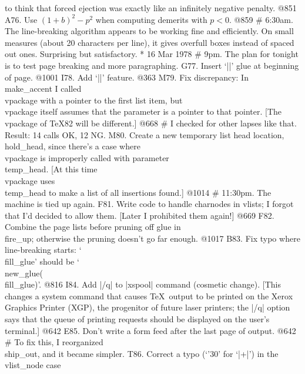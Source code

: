 {	to think that forced ejection was exactly like an
	infinitely negative penalty. @851
A76. Use $(1+b)^2-p^2$ when computing demerits with $p<0$. @859
# 6:30am. The line-breaking algorithm appears to be working fine
	and efficiently.
	On small measures (about 20 characters per line), it gives overfull boxes
	instead of spaced out ones. Surprising but satisfactory.
* 16 Mar 1978
# 9pm. The plan for tonight is to test page breaking and more paragraphing.
G77. Insert `|\topskip|' glue at beginning of page. @1001
I78. Add `|\pausing|' feature. @363
M79. Fix discrepancy: In \\{make_accent} I called \\{vpackage}
	with a pointer to the first list item, but \\{vpackage} itself assumes
	that the parameter is a pointer to that pointer. [The
	\\{vpackage} of \TeX82 will be different.] @668
# I checked for other lapses like that. Result: 14 calls OK, 12 NG.
M80. Create a new temporary list head location, \\{hold_head}, since there's
	a case where \\{vpackage} is improperly called with
	parameter \\{temp_head}. [At this time \\{vpackage} uses \\{temp_head}
	to make a list of all insertions found.] @1014
# 11:30pm. The machine is tied up again.
F81. Write code to handle charnodes in vlists; I forgot that I'd decided
	to allow them. [Later I prohibited them again!] @669
F82. Combine the page lists before pruning off glue
	in \\{fire_up}; otherwise the pruning doesn't go far enough. @1017
B83. Fix typo where line-breaking starts: `\\{fill_glue}' should be
	`\\{new_glue}(\\{fill_glue})'. @816
I84. Add |/q| to |xspool| command (cosmetic change). [This changes a system
	command that causes \TeX\ output to be printed on the Xerox Graphics
	Printer (XGP), the progenitor of future laser printers;
	the |/q| option says that the queue of printing requests should be
	displayed on the user's terminal.] @642
E85. Don't write a form feed after the last page of output. @642
# To fix this, I reorganized \\{ship_out}, and it became simpler.
T86. Correct a typo (`{\tentex\char'30}' for `|+|') in the \\{vlist_node} case
}
